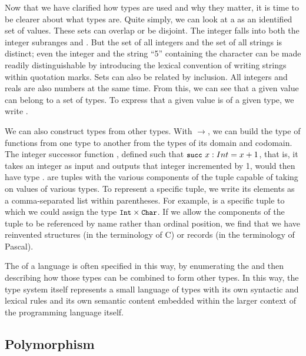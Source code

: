 Now that we have clarified how types are used and why they matter, it is time to be clearer about what types are. Quite simply, we can look at a  as an identified set of values. These sets can overlap or be disjoint. The integer  falls into both the integer subranges  and . But the set of all integers and the set of all strings is distinct; even the integer  and the string ``5'' containing the character  can be made readily distinguishable by introducing the lexical convention of writing strings within quotation marks. Sets can also be related by inclusion. All integers and reals are also numbers at the same time. From this, we can see that a given value can belong to a set of types. To express that a given value is of a given type, we write .

We can also construct types from other types. With $\to$, we can build the type of functions from one type to another from the types of its domain and codomain. The integer successor function , defined such that $\text{\code{succ} } \stmt{x}{Int} = x + 1$, that is, it takes an integer as input and outputs that integer incremented by 1, would then have type .  are tuples with the various components of the tuple capable of taking on values of various types. To represent a specific tuple, we write its elements as a comma-separated list within parentheses. For example,  is a specific tuple to which we could assign the type $\text{\text{\small\ttfamily Int}} \times \text{\text{\small\ttfamily Char}}$. If we allow the components of the tuple to be referenced by name rather than ordinal position, we find that we have reinvented structures (in the terminology of C) or records (in the terminology of Pascal).

The  of a language is often specified in this way, by enumerating the  and then describing how those types can be combined to form other types. In this way, the type system itself represents a small language of types with its own syntactic and lexical rules and its own semantic content embedded within the larger context of the programming language itself.

\subsection{Polymorphism}\label{types:polymorphism}
